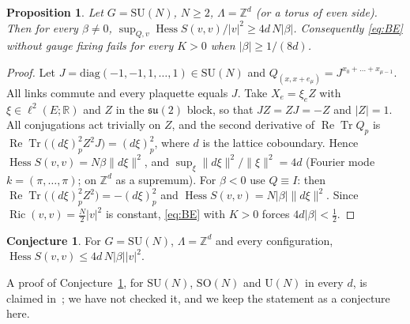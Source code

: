 \documentclass[11pt]{amsart}
\newtheorem{proposition}[theorem]{Proposition}
\theoremstyle{definition}
\newtheorem{conjecture}[theorem]{Conjecture}
\theoremstyle{remark}
\newcommand{\Tr}{\operatorname{Tr}}
\renewcommand{\Re}{\operatorname{Re}}
\newcommand{\Hess}{\operatorname{Hess}}
\newcommand{\Ric}{\operatorname{Ric}}
\newcommand{\SU}{\mathrm{SU}}
\newcommand{\SO}{\mathrm{SO}}
\begin{document}
\begin{proposition}\label{prop:obstruction}
Let $G=\SU(N)$, $N\ge2$, $\Lambda=\mathbb{Z}^d$ (or a torus of even side). Then for every
$\beta\neq0$, $\sup_{Q,v}\Hess S(v,v)/|v|^2\ge4d\,N|\beta|$. Consequently \eqref{eq:BE} without gauge fixing fails
for every $K>0$ when $|\beta|\ge1/(8d)$.
\end{proposition}

\begin{proof}
Let $J=\mathrm{diag}(-1,-1,1,\dots,1)\in\SU(N)$ and $Q_{(x,x+e_\mu)}=J^{x_0+\dots+x_{\mu-1}}$. All links commute and
every plaquette equals $J$. Take $X_e=\xi_e Z$ with $\xi\in\ell^2(E;\mathbb{R})$ and $Z$ in the $\mathfrak{su}(2)$
block, so that $JZ=ZJ=-Z$ and $|Z|=1$. All conjugations act trivially on $Z$, and the second derivative of
$\Re\Tr Q_p$ is $\Re\Tr\big((d\xi)_p^2Z^2J\big)=(d\xi)_p^2$, where $d$ is the lattice coboundary. Hence
$\Hess S(v,v)=N\beta\|d\xi\|^2$, and $\sup_\xi\|d\xi\|^2/\|\xi\|^2=4d$ (Fourier mode $k=(\pi,\dots,\pi)$; on
$\mathbb{Z}^d$ as a supremum). For $\beta<0$ use $Q\equiv I$: then $\Re\Tr\big((d\xi)_p^2Z^2\big)=-(d\xi)_p^2$ and
$\Hess S(v,v)=N|\beta|\|d\xi\|^2$. Since $\Ric(v,v)=\frac{N}{2}|v|^2$ is constant, \eqref{eq:BE} with $K>0$ forces
$4d|\beta|<\frac{1}{2}$.
\end{proof}

\begin{conjecture}\label{conj}
For $G=\SU(N)$, $\Lambda=\mathbb{Z}^d$ and every configuration, $\Hess S(v,v)\le 4d\,N|\beta||v|^2$.
\end{conjecture}

\noindent A proof of Conjecture~\ref{conj}, for $\SU(N)$, $\SO(N)$ and $\mathrm{U}(N)$ in every $d$, is claimed
in~\cite{BB-sharp}; we have not checked it, and we keep the statement as a conjecture here.
\end{document}
